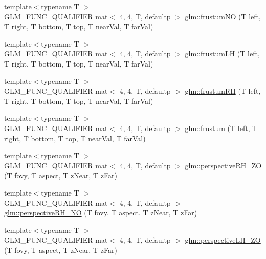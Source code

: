\begin{DoxyCompactItemize}
\item 
{\footnotesize template$<$typename T $>$ }\\G\+L\+M\+\_\+\+F\+U\+N\+C\+\_\+\+Q\+U\+A\+L\+I\+F\+I\+ER mat$<$ 4, 4, T, defaultp $>$ \hyperlink{group__gtc__matrix__transform_gae34ec664ad44860bf4b5ba631f0e0e90}{glm\+::frustum\+NO} (T left, T right, T bottom, T top, T near\+Val, T far\+Val)
\item 
{\footnotesize template$<$typename T $>$ }\\G\+L\+M\+\_\+\+F\+U\+N\+C\+\_\+\+Q\+U\+A\+L\+I\+F\+I\+ER mat$<$ 4, 4, T, defaultp $>$ \hyperlink{group__gtc__matrix__transform_gae4277c37f61d81da01bc9db14ea90296}{glm\+::frustum\+LH} (T left, T right, T bottom, T top, T near\+Val, T far\+Val)
\item 
{\footnotesize template$<$typename T $>$ }\\G\+L\+M\+\_\+\+F\+U\+N\+C\+\_\+\+Q\+U\+A\+L\+I\+F\+I\+ER mat$<$ 4, 4, T, defaultp $>$ \hyperlink{group__gtc__matrix__transform_ga4366ab45880c6c5f8b3e8c371ca4b136}{glm\+::frustum\+RH} (T left, T right, T bottom, T top, T near\+Val, T far\+Val)
\item 
{\footnotesize template$<$typename T $>$ }\\G\+L\+M\+\_\+\+F\+U\+N\+C\+\_\+\+Q\+U\+A\+L\+I\+F\+I\+ER mat$<$ 4, 4, T, defaultp $>$ \hyperlink{group__gtc__matrix__transform_ga0bcd4542e0affc63a0b8c08fcb839ea9}{glm\+::frustum} (T left, T right, T bottom, T top, T near\+Val, T far\+Val)
\item 
{\footnotesize template$<$typename T $>$ }\\G\+L\+M\+\_\+\+F\+U\+N\+C\+\_\+\+Q\+U\+A\+L\+I\+F\+I\+ER mat$<$ 4, 4, T, defaultp $>$ \hyperlink{group__gtc__matrix__transform_ga4da358d6e1b8e5b9ae35d1f3f2dc3b9a}{glm\+::perspective\+R\+H\+\_\+\+ZO} (T fovy, T aspect, T z\+Near, T z\+Far)
\item 
{\footnotesize template$<$typename T $>$ }\\G\+L\+M\+\_\+\+F\+U\+N\+C\+\_\+\+Q\+U\+A\+L\+I\+F\+I\+ER mat$<$ 4, 4, T, defaultp $>$ \hyperlink{group__gtc__matrix__transform_gad1526cb2cbe796095284e8f34b01c582}{glm\+::perspective\+R\+H\+\_\+\+NO} (T fovy, T aspect, T z\+Near, T z\+Far)
\item 
{\footnotesize template$<$typename T $>$ }\\G\+L\+M\+\_\+\+F\+U\+N\+C\+\_\+\+Q\+U\+A\+L\+I\+F\+I\+ER mat$<$ 4, 4, T, defaultp $>$ \hyperlink{group__gtc__matrix__transform_gaca32af88c2719005c02817ad1142986c}{glm\+::perspective\+L\+H\+\_\+\+ZO} (T fovy, T aspect, T z\+Near, T z\+Far)

\end{DoxyCompactItemize}
